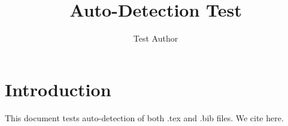 \documentclass{article}
\title{Auto-Detection Test}
\author{Test Author}
\begin{document}
\maketitle

\section{Introduction}

This document tests auto-detection of both .tex and .bib files. We cite \textcite{testwork2024} here.

\printbibliography
\end{document}
